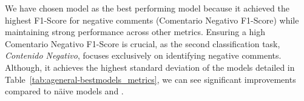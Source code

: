 \begin{table}[H]
    \centering
    \begingroup
    \small %
    \endgroup
\end{table}




We have chosen model \textbf{\agrfted}  as the best performing model because it achieved the highest F1-Score for negative comments (Comentario Negativo F1-Score) while maintaining strong performance across other metrics. Ensuring a high Comentario Negativo F1-Score is crucial, as the second classification task, \textit{Contenido Negativo}, focuses exclusively on identifying negative comments. Although, it achieves the highest standard deviation of the models detailed in Table~\ref{tab:ageneral-bestmodels_metrics}, we can see significant improvements compared to näive models {\agmajor} and {\agrandom}.


